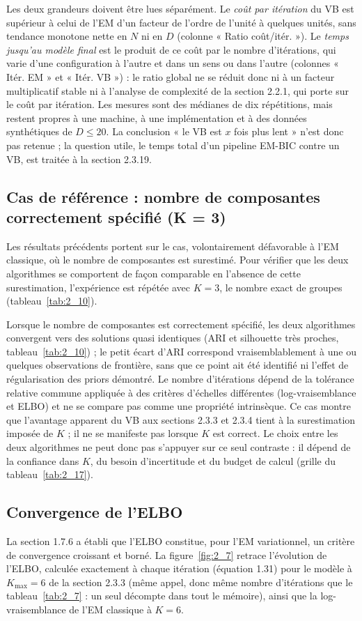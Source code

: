 Les deux grandeurs doivent être lues séparément. Le \emph{coût par itération} du VB est supérieur à celui de l'EM d'un facteur de l'ordre de l'unité à quelques unités, sans tendance monotone nette en $N$ ni en $D$ (colonne « Ratio coût/itér. »). Le \emph{temps jusqu'au modèle final} est le produit de ce coût par le nombre d'itérations, qui varie d'une configuration à l'autre et dans un sens ou dans l'autre (colonnes « Itér. EM » et « Itér. VB ») : le ratio global ne se réduit donc ni à un facteur multiplicatif stable ni à l'analyse de complexité de la section 2.2.1, qui porte sur le coût par itération. Les mesures sont des médianes de dix répétitions, mais restent propres à une machine, à une implémentation et à des données synthétiques de $D \leq 20$. La conclusion « le VB est $x$ fois plus lent » n'est donc pas retenue ; la question utile, le temps total d'un pipeline EM-BIC contre un VB, est traitée à la section 2.3.19.

\subsection{Cas de référence : nombre de composantes correctement spécifié (K = 3)}
Les résultats précédents portent sur le cas, volontairement défavorable à l'EM classique, où le nombre de composantes est surestimé. Pour vérifier que les deux algorithmes se comportent de façon comparable en l'absence de cette surestimation, l'expérience est répétée avec $K = 3$, le nombre exact de groupes (tableau~\ref{tab:2_10}).

Lorsque le nombre de composantes est correctement spécifié, les deux algorithmes convergent vers des solutions quasi identiques (ARI et silhouette très proches, tableau~\ref{tab:2_10}) ; le petit écart d'ARI correspond vraisemblablement à une ou quelques observations de frontière, sans que ce point ait été identifié ni l'effet de régularisation des priors démontré. Le nombre d'itérations dépend de la tolérance relative commune appliquée à des critères d'échelles différentes (log-vraisemblance et ELBO) et ne se compare pas comme une propriété intrinsèque. Ce cas montre que l'avantage apparent du VB aux sections 2.3.3 et 2.3.4 tient à la surestimation imposée de $K$ ; il ne se manifeste pas lorsque $K$ est correct. Le choix entre les deux algorithmes ne peut donc pas s'appuyer sur ce seul contraste : il dépend de la confiance dans $K$, du besoin d'incertitude et du budget de calcul (grille du tableau~\ref{tab:2_17}).

\subsection{Convergence de l'ELBO}
La section 1.7.6 a établi que l'ELBO constitue, pour l'EM variationnel, un critère de convergence croissant et borné. La figure~\ref{fig:2_7} retrace l'évolution de l'ELBO, calculée exactement à chaque itération (équation 1.31) pour le modèle à $K_{\max}=6$ de la section 2.3.3 (même appel, donc même nombre d'itérations que le tableau~\ref{tab:2_7} : un seul décompte dans tout le mémoire), ainsi que la log-vraisemblance de l'EM classique à $K=6$.

